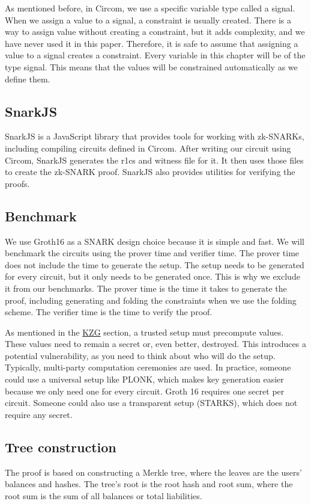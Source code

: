 As mentioned before, in Circom, we use a specific variable type called a signal. When we assign a value to a signal, a constraint is usually created.
There is a way to assign value without creating a constraint, but it adds complexity, and we have never used it in this paper. 
Therefore, it is safe to assume that assigning a value to a signal creates a constraint. 
Every variable in this chapter will be of the type signal.
This means that the values will be constrained automatically as we define them. 
\subsection{SnarkJS} 

SnarkJS is a JavaScript library that provides tools for working with zk-SNARKs, including compiling circuits defined in Circom. 
After writing our circuit using Circom, SnarkJS generates the r1cs and witness file for it. It then uses those files to create the zk-SNARK proof.
SnarkJS also provides utilities for verifying the proofs.

\subsection{Benchmark} 
We use Groth16 as a SNARK design choice because it is simple and fast. 
We will benchmark the circuits using the prover time and verifier time. The prover time does not include the time to generate the setup.
The setup needs to be generated for every circuit, but it only needs to be generated once. This is why we exclude it from our benchmarks.
The prover time is the time it takes to generate the proof, including generating and folding the constraints when we use the folding scheme. 
The verifier time is the time to verify the proof.

As mentioned in the \hyperref[subsec:plc]{KZG} section, a trusted setup must precompute values. These values need to remain a secret or, even better, destroyed.
This introduces a potential vulnerability, as you need to think about who will do the setup. Typically, multi-party computation ceremonies are used.
In practice, someone could use a universal setup like PLONK, which makes key generation easier because we only need one for every circuit. Groth 16 requires one secret per circuit.
Someone could also use a transparent setup (STARKS), which does not require any secret.

\subsection{Tree construction}
The proof is based on constructing a Merkle tree, where the leaves are the users' balances and hashes. The tree's root is the root hash and root sum, where the root sum is the sum of all balances or total liabilities.


